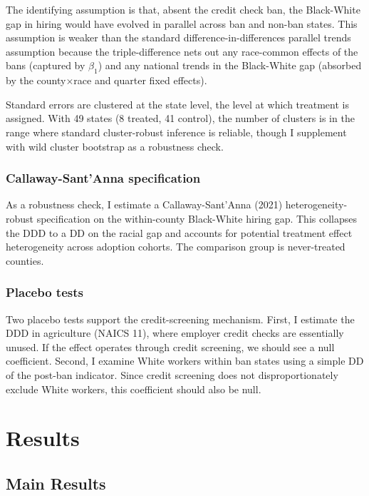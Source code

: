 \documentclass[12pt]{article}
\begin{document}
The identifying assumption is that, absent the credit check ban, the Black-White gap in hiring would have evolved in parallel across ban and non-ban states. This assumption is weaker than the standard difference-in-differences parallel trends assumption because the triple-difference nets out any race-common effects of the bans (captured by $\beta_1$) and any national trends in the Black-White gap (absorbed by the county$\times$race and quarter fixed effects).

Standard errors are clustered at the state level, the level at which treatment is assigned. With 49 states (8 treated, 41 control), the number of clusters is in the range where standard cluster-robust inference is reliable, though I supplement with wild cluster bootstrap as a robustness check.

\subsubsection*{Callaway-Sant'Anna specification} As a robustness check, I estimate a Callaway-Sant'Anna (2021) heterogeneity-robust specification on the within-county Black-White hiring gap. This collapses the DDD to a DD on the racial gap and accounts for potential treatment effect heterogeneity across adoption cohorts. The comparison group is never-treated counties.

\subsubsection*{Placebo tests} Two placebo tests support the credit-screening mechanism. First, I estimate the DDD in agriculture (NAICS 11), where employer credit checks are essentially unused. If the effect operates through credit screening, we should see a null coefficient. Second, I examine White workers within ban states using a simple DD of the post-ban indicator. Since credit screening does not disproportionately exclude White workers, this coefficient should also be null.

\section{Results}
\label{sec:results}

\subsection{Main Results}


\end{document}
